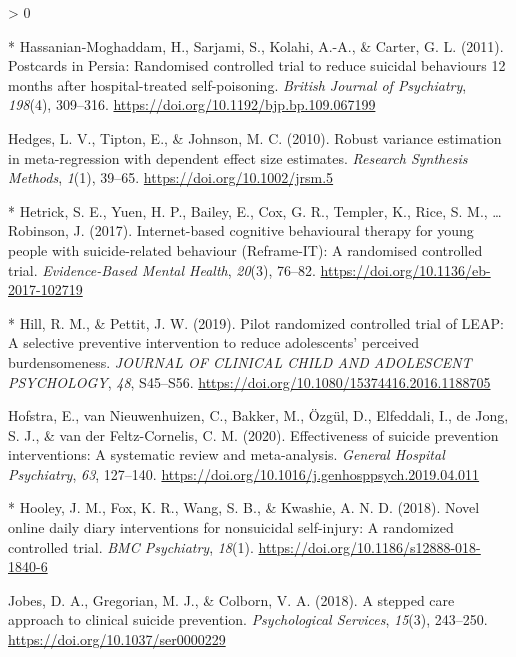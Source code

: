 \documentclass[
  english,
  man]{apa6}
\newlength{\cslhangindent}
\newenvironment{CSLReferences}[2] %
 {%
  \setlength{\parindent}{0pt}
  \ifodd #1 \everypar{\setlength{\hangindent}{\cslhangindent}}\ignorespaces\fi
  \ifnum #2 > 0
  \setlength{\parskip}{#2\baselineskip}
  \fi
 }%
 {}
\begin{document}
\begin{CSLReferences}{1}{0}
\leavevmode\hypertarget{ref-hassanian-moghaddam2011}{}%
* Hassanian-Moghaddam, H., Sarjami, S., Kolahi, A.-A., \& Carter, G. L. (2011). Postcards in {Persia}: Randomised controlled trial to reduce suicidal behaviours 12 months after hospital-treated self-poisoning. \emph{British Journal of Psychiatry}, \emph{198}(4), 309--316. \url{https://doi.org/10.1192/bjp.bp.109.067199}

\leavevmode\hypertarget{ref-hedges2010}{}%
Hedges, L. V., Tipton, E., \& Johnson, M. C. (2010). Robust variance estimation in meta-regression with dependent effect size estimates. \emph{Research Synthesis Methods}, \emph{1}(1), 39--65. \url{https://doi.org/10.1002/jrsm.5}

\leavevmode\hypertarget{ref-hetrick2017}{}%
* Hetrick, S. E., Yuen, H. P., Bailey, E., Cox, G. R., Templer, K., Rice, S. M., \ldots{} Robinson, J. (2017). Internet-based cognitive behavioural therapy for young people with suicide-related behaviour ({Reframe}-{IT}): A randomised controlled trial. \emph{Evidence-Based Mental Health}, \emph{20}(3), 76--82. \url{https://doi.org/10.1136/eb-2017-102719}

\leavevmode\hypertarget{ref-hill2019}{}%
* Hill, R. M., \& Pettit, J. W. (2019). Pilot randomized controlled trial of {LEAP}: A selective preventive intervention to reduce adolescents' perceived burdensomeness. \emph{JOURNAL OF CLINICAL CHILD AND ADOLESCENT PSYCHOLOGY}, \emph{48}, S45--S56. \url{https://doi.org/10.1080/15374416.2016.1188705}

\leavevmode\hypertarget{ref-hofstra2020}{}%
Hofstra, E., van Nieuwenhuizen, C., Bakker, M., Özgül, D., Elfeddali, I., de Jong, S. J., \& van der Feltz-Cornelis, C. M. (2020). Effectiveness of suicide prevention interventions: A systematic review and meta-analysis. \emph{General Hospital Psychiatry}, \emph{63}, 127--140. \url{https://doi.org/10.1016/j.genhosppsych.2019.04.011}

\leavevmode\hypertarget{ref-hooley2018}{}%
* Hooley, J. M., Fox, K. R., Wang, S. B., \& Kwashie, A. N. D. (2018). Novel online daily diary interventions for nonsuicidal self-injury: A randomized controlled trial. \emph{BMC Psychiatry}, \emph{18}(1). \url{https://doi.org/10.1186/s12888-018-1840-6}

\leavevmode\hypertarget{ref-jobes2018}{}%
Jobes, D. A., Gregorian, M. J., \& Colborn, V. A. (2018). A stepped care approach to clinical suicide prevention. \emph{Psychological Services}, \emph{15}(3), 243--250. \url{https://doi.org/10.1037/ser0000229}


\end{CSLReferences}
\end{document}

